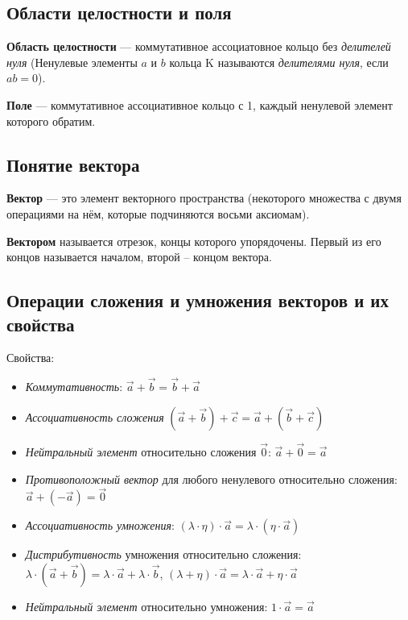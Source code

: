 \documentclass[a4paper]{article}
\begin{document}
    \subsection*{Области целостности и поля}
    \textbf{Область целостности} --- коммутативное ассоциатовное кольцо без \textit{делителей нуля} (Ненулевые элементы $a$ и $b$ кольца K называются \textit{делителями нуля}, если $ab = 0$).

    \textbf{Поле} --- коммутативное ассоциативное кольцо с 1, каждый ненулевой элемент которого обратим.


    \newpage \begin{center}
                 \begin{Large}
                 \end{Large}
    \end{center}
    \subsection*{Понятие вектора}
    \textbf{Вектор} — это элемент векторного пространства (некоторого множества с двумя операциями на нём, которые подчиняются восьми аксиомам).

    \textbf{Вектором} называется отрезок,
    концы которого упорядочены. Первый из его концов
    называется началом, второй – концом вектора.

    \subsection*{Операции сложения и умножения векторов и их свойства}

    Свойства:
    \begin{itemize}
        \item \textit{Коммутативность}: $\vec{a} + \vec{b} = \vec{b} + \vec{a}$
        \item \textit{Ассоциативность сложения} $(\vec{a} + \vec{b}) + \vec{c} = \vec{a} + (\vec{b}+\vec{c})$
        \item \textit{Нейтральный элемент} относительно сложения $\vec{0}$: $\vec{a} + \vec{0} = \vec{a}$
        \item \textit{Противоположный вектор} для любого ненулевого относительно сложения: $\vec{a}+(-\vec{a}) = \vec{0}$
        \item \textit{Ассоциативность умножения}: $(\lambda \cdot \eta) \cdot \vec{a} = \lambda \cdot ( \eta \cdot \vec{a})$
        \item \textit{Дистрибутивность} умножения относительно сложения: $\lambda \cdot (\vec{a} + \vec{b}) = \lambda \cdot \vec{a} + \lambda \cdot \vec{b}$, $(\lambda + \eta) \cdot \vec{a} = \lambda \cdot \vec{a} + \eta \cdot \vec{a}$
        \item \textit{Нейтральный элемент} относительно умножения: $1 \cdot \vec{a} = \vec{a}$
    \end{itemize}
\end{document}
